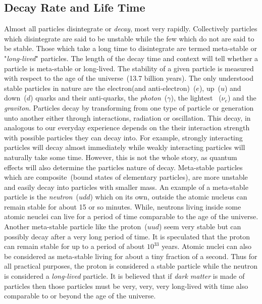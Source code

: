 \subsection{Decay Rate and Life Time}
Almost all particles disintegrate or \textit{decay}, most very rapidly. Collectively particles which disintegrate are said to be unstable while the few which do not are said to be stable. Those which take a long time to disintegrate are termed meta-stable or "\textit{long-lived}" particles. The length of the decay time and context will tell whether a particle is meta-stable or long-lived. The stability of a given particle is measured with respect to the age of the universe~(13.7 billion years). The only understood stable particles in nature are the \textsf{electron}(and \textsf{anti-electron})~($e$), \textsf{up}~($u$) and \textsf{down}~($d$) quarks and their anti-quarks, the \textit{photon}~($\gamma$), the lightest ~($\nu_{e}$) and the \textit{graviton}. 
Particles decay by transforming from one type of particle or generation unto another either through interactions, radiation or oscillation.  This decay, in analogous to our everyday experience depends on the their interaction strength with possible particles they can decay into. For example, strongly interacting particles will decay almost immediately while weakly interacting particles will naturally take some time. However, this is not the whole story, as quantum effects will also determine the particles nature of decay.
Meta-stable particles which are composite~(bound states of elementary particles), are more unstable and easily decay into particles with smaller mass. An example of a meta-stable particle is the \textit{neutron}~(\textsf{$udd$}) which on its own, outside the atomic nucleus can remain stable for about 15 or so minutes. While, neutrons living inside some atomic neuclei can live for a period of time comparable to the age of the universe. Another meta-stable particle like the proton~(\textsf{$uud$}) seem very stable but can possibly decay after a very long period of time. It is speculated that the proton can remain stable for up to a period of about $10^{33}$ years. Atomic nuclei can also be considered as meta-stable living for about a tiny fraction of a second. Thus for all practical purposes, the proton is considered a stable particle while the neutron is considered a \textit{long-lived} particle.  It is believed that if \textit{dark matter} is made of particles then those particles  must be very, very, very long-lived with time also comparable  to or beyond  the age of the universe.

